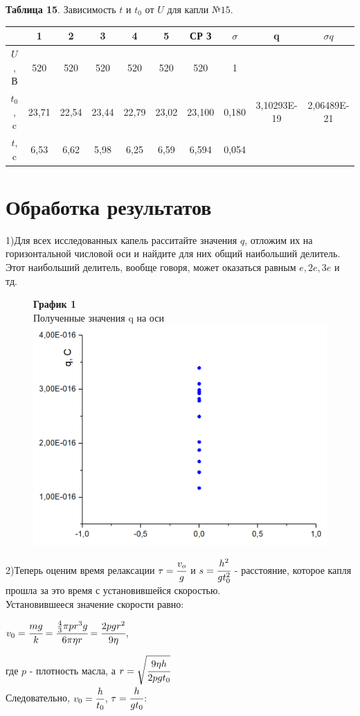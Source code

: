 \documentclass[11pt,a4paper]{article}
\begin{document}
\begin{table}[h!]
	\begin{center}
		\textbf{Таблица 15}. Зависимость $t$ и $t_0$ от $U$ для капли $№15$.\\
	\begin{tabular}{|c|c|c|c|c|c|c|c|c|c|}
		
			\hline
			 & \textbf{1} & \textbf{2} & \textbf{3} &\textbf{4} &\textbf{5} & СР З & $\sigma$  & q& $\sigma q$ \\ \hline
			$U$, В & 520 & 520 & 520 & 520 & 520 &  520 & 1  \\ \hline
			$t_0$, c  & 23,71 & 22,54 & 23,44 & 22,79 & 23,02 & 23,100  & 0,180 & 3,10293E-19
 & 2,06489E-21
\\ \hline
			$t$, c   & 6,53 & 6,62 & 5,98 & 6,25 & 6,59 & 6,594 & 0,054\\ \hline
	\end{tabular}
	\end{center}
\end{table}
\newpage
\part*{Обработка результатов}
1)Для всех исследованных капель расситайте значения $q$, отложим их на горизонтальной числовой оси и найдите для них общий наибольший делитель. Этот наибольший делитель, вообще говоря, может оказаться равным $e, 2e, 3e$ и тд.
\begin{figure} [h!]
	\centering
	\textbf {График 1} \\
	Полученные значения q на оси\\
	\includegraphics[width=0.5\linewidth]{1.png}
\end{figure}
\newpage

2)Теперь оценим время релаксации $ \tau = \cfrac{v_{o}}{g}$ и $s = \cfrac{h^2}{gt_0^2}$ - расстояние, которое капля прошла за это время с установившейся скоростью.\\
Установившееся значение скорости равно:\\
\begin{center}
$v_0 = \cfrac{mg}{k} = \cfrac{\frac{4}{3} \pi p r^3 g}{6 \pi \eta r} = \cfrac{2 p g r^2}{9 \eta}$,
\end{center}
где $p$ - плотность масла, а $r = \sqrt{\cfrac{9 \eta h}{2 p g t_0}}$ \\
Следовательно, $v_0 = \cfrac{h}{t_0}$, $\tau = \cfrac{h}{gt_0}$:\\
\end{document}

